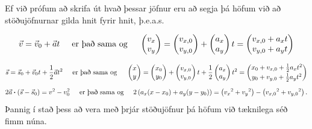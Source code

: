 Ef við prófum að skrifa út hvað þessar jöfnur eru að segja þá höfum við að stöðujöfnurnar gilda hnit fyrir hnit, þ.e.a.s.

\begin{align*}
    \vec{v} = \vec{v}_0 + \vec{a}t \hspace{0.5cm} \text{er það sama og} \hspace{0.5cm} \begin{pmatrix}
v_{x}\\
v_{y} \\
\end{pmatrix} = \begin{pmatrix}
v_{x,0}\\
v_{y,0} \\
\end{pmatrix} + \begin{pmatrix}
a_x\\
a_y \\
\end{pmatrix} t = \begin{pmatrix}
v_{x,0} + a_x t\\
v_{y,0} + a_y t \\
\end{pmatrix}
\end{align*}

\begin{align*}
    \vec{s} = \vec{s}_0 + \vec{v}_0 t + \frac{1}{2}\vec{a}t^2 \hspace{0.5cm} \text{er það sama og} \hspace{0.5cm} \begin{pmatrix}
x\\
y \\
\end{pmatrix} = \begin{pmatrix}
x_0\\
y_0 \\
\end{pmatrix} + \begin{pmatrix}
v_{x,0}\\
v_{y,0} \\
\end{pmatrix} t + \frac{1}{2} \begin{pmatrix}
a_x\\
a_y \\
\end{pmatrix} t^2 = \begin{pmatrix}
x_0 + v_{x,0} + \frac{1}{2}a_x t^2\\[2pt]
y_0 + v_{y,0} + \frac{1}{2}a_y t^2
\end{pmatrix}
\end{align*}
\begin{align*}
       2\vec{a} \vdot (\vec{s} - \vec{s}_0) = v^2 - v_0^2 \hspace{0.5cm} \text{er það sama og} \hspace{0.5cm} 2\left( a_x (x-x_0) + a_y (y - y_0) \right) = \left( {v_x}^2 + {v_y}^2 \right) - \left( {v_{x,0}}^2 + {v_{y,0}}^2 \right).
\end{align*}
Þannig í stað þess að vera með þrjár stöðujöfnur þá höfum við tæknilega séð fimm núna.

